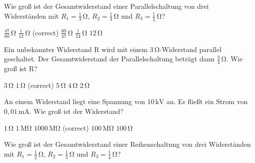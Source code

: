 \documentclass[11pt]{exam}
\begin{document}
\setlength{\voffset}{-0.5in}
\setlength{\headsep}{5pt}

\hspace{2mm}
 \hspace{5mm}
\vspace{4mm}

\begin{questions}

\question Wie groß ist der Gesamtwiderstand einer Parallelschaltung von drei Widerständen mit \(R_1=\mathrm{\frac{1}{3}\,\Omega}\), \(R_2=\mathrm{\frac{1}{4}\,\Omega}\) und \(R_3=\mathrm{\frac{1}{5}\,\Omega}\)?

\begin{choices}
	\choice \(\mathrm{\frac{47}{60}\,\Omega}\)
	\choice \(\mathrm{\frac{1}{12}\,\Omega}\) (correct)
	\choice \(\mathrm{\frac{60}{47}\,\Omega}\)
	\choice \(\mathrm{\frac{1}{24}\,\Omega}\)
	\choice \(\mathrm{12\,\Omega}\)
\end{choices}

\vspace{3mm}\question Ein unbekannter Widerstand \(\mathrm{R}\) wird mit einem \(\mathrm{3\,\Omega}\)-Widerstand parallel geschaltet. Der Gesamtwiderstand der Parallelschaltung beträgt dann \(\mathrm{\frac{3}{4}\,\Omega}\). Wie groß ist \(\mathrm{R}\)?

\begin{choices}
	\choice \(\mathrm{3\,\Omega}\)
	\choice \(\mathrm{1\,\Omega}\) (correct)
	\choice \(\mathrm{5\,\Omega}\)
	\choice \(\mathrm{4\,\Omega}\)
	\choice \(\mathrm{2\,\Omega}\)
\end{choices}

\vspace{3mm}\question An einem Widerstand liegt eine Spannung von \(10\,\mathrm{kV}\) an. Es fließt ein Strom von \(\mathrm{0,01\,mA}\). Wie groß ist der Widerstand?

\begin{choices}
	\choice \(\mathrm{1\,\Omega}\)
	\choice \(\mathrm{1\,M\Omega}\)
	\choice \(\mathrm{1000\,M\Omega}\) (correct)
	\choice \(\mathrm{100\,M\Omega}\)
	\choice \(\mathrm{100\,\Omega}\)
\end{choices}

\vspace{3mm}\question Wie groß ist der Gesamtwiderstand einer Reihenschaltung von drei Widerständen mit \(R_1=\mathrm{\frac{1}{2}\,\Omega}\), \(R_2=\mathrm{\frac{1}{3}\,\Omega}\) und \(R_3=\mathrm{\frac{1}{4}\,\Omega}\)?


\end{questions}
\end{document}
